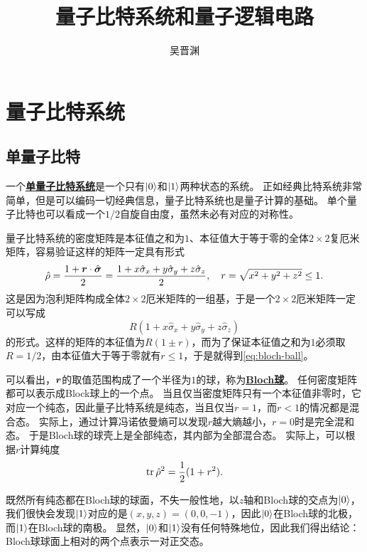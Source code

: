 \documentclass[hyperref, UTF8, a4paper]{ctexart}
\title{量子比特系统和量子逻辑电路}
\author{吴晋渊}
\newcommand*{\concept}[1]{\underline{\textbf{#1}}}
\begin{document}
\maketitle

\section{量子比特系统}

\subsection{单量子比特}

一个\concept{单量子比特系统}是一个只有$\ket{0}$和$\ket{1}$两种状态的系统。
正如经典比特系统非常简单，但是可以编码一切经典信息，量子比特系统也是量子计算的基础。
单个量子比特也可以看成一个$1/2$自旋自由度，虽然未必有对应的对称性。

量子比特系统的密度矩阵是本征值之和为$1$、本征值大于等于零的全体$2 \times 2$复厄米矩阵，容易验证这样的矩阵一定具有形式
\begin{equation}
    \hat{\rho} = \frac{1 + \vb*{r} \cdot \hat{\vb*{\sigma}}}{2} = \frac{1 + x \hat{\sigma}_x + y \hat{\sigma}_y + z \hat{\sigma}_z}{2}, \quad r = \sqrt{x^2+y^2+z^2} \leq 1.
    \label{eq:bloch-ball}
\end{equation}
这是因为泡利矩阵构成全体$2\times 2$厄米矩阵的一组基，于是一个$2\times 2$厄米矩阵一定可以写成
\[
    R(1 + x \hat{\sigma}_x + y \hat{\sigma}_y + z \hat{\sigma}_z)
\]
的形式。这样的矩阵的本征值为$R(1 \pm r)$，而为了保证本征值之和为$1$必须取$R=1/2$，由本征值大于等于零就有$r\leq 1$，于是就得到\eqref{eq:bloch-ball}。

可以看出，$\vb*{r}$的取值范围构成了一个半径为$1$的球，称为\concept{Bloch球}。
任何密度矩阵都可以表示成Block球上的一个点。
当且仅当密度矩阵只有一个本征值非零时，它对应一个纯态，因此量子比特系统是纯态，当且仅当$r=1$，而$r<1$的情况都是混合态。
实际上，通过计算冯诺依曼熵可以发现$r$越大熵越小，$r=0$时是完全混和态。
于是Bloch球的球壳上是全部纯态，其内部为全部混合态。
实际上，可以根据$r$计算纯度
\begin{equation}
    \trace \hat{\rho}^2 = \frac{1}{2} (1 + r^2).
\end{equation}

既然所有纯态都在Bloch球的球面，不失一般性地，以$z$轴和Bloch球的交点为$\ket{0}$，我们很快会发现$\ket{1}$对应的是$(x, y, z) = (0, 0, -1)$，因此$\ket{0}$在Bloch球的北极，而$\ket{1}$在Bloch球的南极。
显然，$\ket{0}$和$\ket{1}$没有任何特殊地位，因此我们得出结论：Bloch球球面上相对的两个点表示一对正交态。
\end{document}
